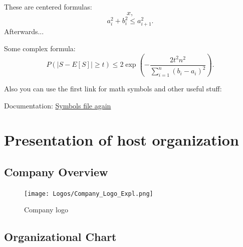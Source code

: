 These are centered formulas: $$x,$$ $$a_i^2 + b_i^2 \le a_{i+1}^2.$$ Afterwards...

Some complex formula: $$P(|S - E[S]| \ge t) \le 2 \exp \left( -\frac{2 t^2 n^2}{\sum_{i = 1}^n (b_i - a_i)^2} \right).$$

Also you can use the first link for math symbols and other useful stuff:

Documentation: \href{https://www.cmor-faculty.rice.edu/~heinken/latex/symbols.pdf}{Symbols file again}



\newpage


\section{Presentation of host organization}



\subsection{Company Overview}

\begin{figure}[H] 
    \centering
    \texttt{[image: Logos/Company\_Logo\_Expl.png]}
    \caption{Company logo}
\end{figure}



\subsection{Organizational Chart}


